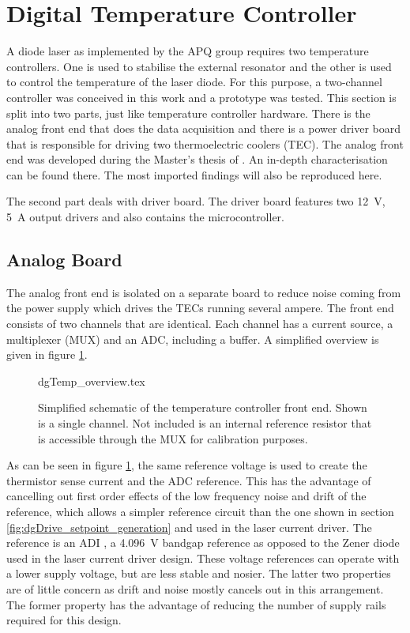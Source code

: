 \clearpage
\section{Digital Temperature Controller}%
\label{sec:temperature_controller}
A diode laser as implemented by the APQ group requires two temperature controllers. One is used to stabilise the external resonator and the other is used to control the temperature of the laser diode. For this purpose, a two-channel controller was conceived in this work and a prototype was tested. This section is split into two parts, just like temperature controller hardware. There is the analog front end that does the data acquisition and there is a power driver board that is responsible for driving two thermoelectric coolers (TEC). The analog front end was developed during the Master's thesis of \citeauthor{thesis_sattelmaier} \cite{thesis_sattelmaier}. An in-depth characterisation can be found there. The most imported findings will also be reproduced here.

The second part deals with driver board. The driver board features two \qty{12}{\V}, \qty{5}{\A} output drivers and also contains the microcontroller.

\subsection{Analog Board}
The analog front end is isolated on a separate board to reduce noise coming from the power supply which drives the TECs running several ampere. The front end consists of two channels that are identical. Each channel has a current source, a multiplexer (MUX) and an ADC, including a buffer. A simplified overview is given in figure \ref{fig:dgTemp_overview}.
\begin{figure}[ht]
    \centering
        {dgTemp_overview.tex}
    \caption{Simplified schematic of the temperature controller front end. Shown is a single channel. Not included is an internal reference resistor that is accessible through the MUX for calibration purposes.}
    \label{fig:dgTemp_overview}
\end{figure}

As can be seen in figure \ref{fig:dgTemp_overview}, the same reference voltage is used to create the thermistor sense current and the ADC reference. This has the advantage of cancelling out first order effects of the low frequency noise and drift of the reference, which allows a simpler reference circuit than the one shown in section \ref{fig:dgDrive_setpoint_generation} and used in the  laser current driver. The reference is an ADI  \cite{datasheet_LTC6655}, a \qty{4.096}{\V} bandgap reference as opposed to the Zener diode used in the laser current driver design. These voltage references can operate with a lower supply voltage, but are less stable and nosier. The latter two properties are of little concern as drift and noise mostly cancels out in this arrangement. The former property has the advantage of reducing the number of supply rails required for this design.


